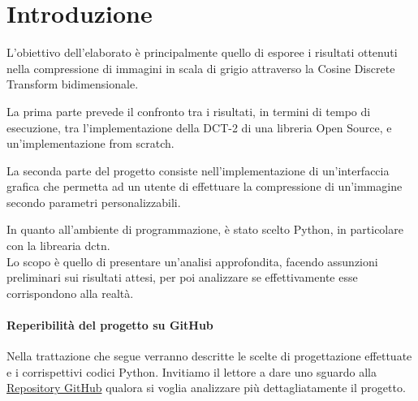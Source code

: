 \section*{Introduzione}


L'obiettivo dell'elaborato è principalmente quello di esporee i risultati ottenuti nella compressione di immagini in scala di grigio attraverso la Cosine Discrete Transform bidimensionale.

La prima parte prevede il confronto tra i risultati, in termini di tempo di esecuzione, tra l'implementazione della DCT-2 di una libreria Open Source, e un'implementazione from scratch.

La seconda parte del progetto consiste nell'implementazione di un'interfaccia grafica che permetta ad un utente di effettuare la compressione di un'immagine secondo parametri personalizzabili.

In quanto all'ambiente di programmazione, è stato scelto Python, in particolare con la librearia dctn.\\
Lo scopo è quello di presentare un'analisi approfondita, facendo assunzioni preliminari sui risultati attesi, per poi analizzare se effettivamente esse corrispondono alla realtà.


\paragraph{Reperibilità del progetto su GitHub}
Nella trattazione che segue verranno descritte le scelte di progettazione effettuate e i corrispettivi codici Python. Invitiamo il lettore a dare uno sguardo alla \href{https://github.com/MarioAvolio/Proj-2-Metodi-Calcolo-Scientifico}{Repository GitHub} qualora si voglia analizzare più dettagliatamente il progetto.